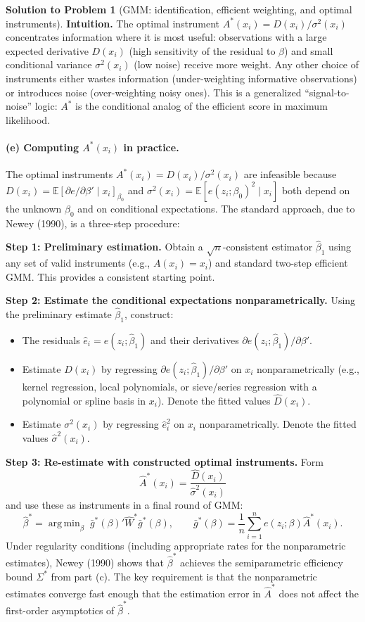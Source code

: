 \documentclass[12pt]{article}
\newcommand{\E}{\mathbb E}
\DeclareMathOperator*{\argmin}{arg\,min}
\theoremstyle{definition}
\newtheorem{solution}{Solution to Problem}
\begin{document}
\begin{solution}[GMM: identification, efficient weighting, and optimal instruments]
\medskip
\noindent\textbf{Intuition.} The optimal instrument $A^*(x_i)=D(x_i)/\sigma^2(x_i)$ concentrates information where it is most useful: observations with a large expected derivative $D(x_i)$ (high sensitivity of the residual to $\beta$) and small conditional variance $\sigma^2(x_i)$ (low noise) receive more weight. Any other choice of instruments either wastes information (under-weighting informative observations) or introduces noise (over-weighting noisy ones). This is a generalized ``signal-to-noise'' logic: $A^*$ is the conditional analog of the efficient score in maximum likelihood.

\bigskip
\paragraph{(e) Computing $A^*(x_i)$ in practice.} The optimal instruments $A^*(x_i)=D(x_i)/\sigma^2(x_i)$ are infeasible because $D(x_i)=\E[\partial e/\partial\beta'\mid x_i]_{\beta_0}$ and $\sigma^2(x_i)=\E[e(z_i;\beta_0)^2\mid x_i]$ both depend on the unknown $\beta_0$ and on conditional expectations. The standard approach, due to Newey (1990), is a three-step procedure:

\medskip
\noindent\textbf{Step 1: Preliminary estimation.} Obtain a $\sqrt{n}$-consistent estimator $\hat\beta_1$ using any set of valid instruments (e.g., $A(x_i)=x_i$) and standard two-step efficient GMM. This provides a consistent starting point.

\medskip
\noindent\textbf{Step 2: Estimate the conditional expectations nonparametrically.} Using the preliminary estimate $\hat\beta_1$, construct:
\begin{itemize}
    \item The residuals $\hat{e}_i = e(z_i;\hat\beta_1)$ and their derivatives $\partial e(z_i;\hat\beta_1)/\partial\beta'$.
    \item Estimate $D(x_i)$ by regressing $\partial e(z_i;\hat\beta_1)/\partial\beta'$ on $x_i$ nonparametrically (e.g., kernel regression, local polynomials, or sieve/series regression with a polynomial or spline basis in $x_i$). Denote the fitted values $\hat{D}(x_i)$.
    \item Estimate $\sigma^2(x_i)$ by regressing $\hat{e}_i^2$ on $x_i$ nonparametrically. Denote the fitted values $\hat\sigma^2(x_i)$.
\end{itemize}

\noindent\textbf{Step 3: Re-estimate with constructed optimal instruments.} Form
\[
\hat{A}^*(x_i)=\frac{\hat{D}(x_i)}{\hat\sigma^2(x_i)}
\]
and use these as instruments in a final round of GMM:
\[
\hat\beta^* = \argmin_\beta\;\bar{g}^*(\beta)'\hat{W}^*\bar{g}^*(\beta), \qquad \bar{g}^*(\beta) = \frac{1}{n}\sum_{i=1}^n e(z_i;\beta)\hat{A}^*(x_i).
\]
Under regularity conditions (including appropriate rates for the nonparametric estimates), Newey (1990) shows that $\hat\beta^*$ achieves the semiparametric efficiency bound $\Sigma^*$ from part (c). The key requirement is that the nonparametric estimates converge fast enough that the estimation error in $\hat{A}^*$ does not affect the first-order asymptotics of $\hat\beta^*$.


\end{solution}
\end{document}
